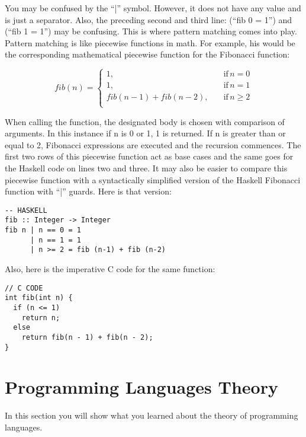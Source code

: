 \documentclass{article}
\begin{document}
\medskip\noindent
You may be confused by the “|” symbol. However, it does not have any value and is just a separator. Also, the preceding second and third line: (“fib 0 = 1”) and (“fib 1 = 1”) may be confusing. This is where pattern matching comes into play. Pattern matching is like piecewise functions in math. For example, his would be the corresponding mathematical piecewise function for the Fibonacci function:

\begin{equation*}
fib(n)=\begin{cases}
          1, \quad &\text{if} \, n = 0 \\
          1, \quad &\text{if} \, n = 1 \\
          fib(n-1)+fib(n-2), \quad &\text{if} \, n \geq 2 \\
      \end{cases}
\end{equation*}

\medskip\noindent
When calling the function, the designated body is chosen with comparison of arguments. In this instance if n is 0 or 1, 1 is returned. If n is greater than or equal to 2, Fibonacci expressions are executed and the recursion commences. The first two rows of this piecewise function act as base cases and the same goes for the Haskell code on lines two and three. It may also be easier to compare this piecewise function with a syntactically simplified version of the Haskell Fibonacci function with “|” guards. Here is that version:

\begin{lstlisting}[style=HaskellStyle]
-- HASKELL
fib :: Integer -> Integer
fib n | n == 0 = 1
      | n == 1 = 1
      | n >= 2 = fib (n-1) + fib (n-2)
\end{lstlisting}

\medskip\noindent
Also, here is the imperative C code for the same function:

\begin{lstlisting}[style=CStyle]
// C CODE
int fib(int n) {
  if (n <= 1)
    return n;
  else
    return fib(n - 1) + fib(n - 2);
}
\end{lstlisting}

\section{Programming Languages Theory}

In this section you will show what you learned about the theory of programming languages. 
\end{document}
